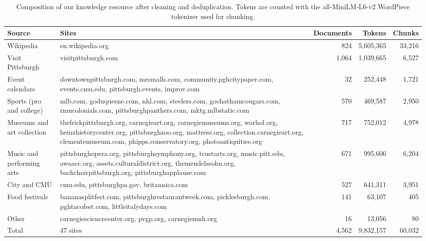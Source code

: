\begin{table}[t]
\centering
\small
\begin{tabular}{lp{}rrr}
\toprule
Source & Sites & Documents & Tokens & Chunks \\
\midrule
Wikipedia & en.wikipedia.org & 824 & 5,605,365 & 33,216 \\
Visit Pittsburgh & visitpittsburgh.com & 1,064 & 1,039,665 & 6,527 \\
Event calendars & downtownpittsburgh.com, mrsmalls.com, community.pghcitypaper.com, events.cmu.edu, pittsburgh.events, improv.com & 32 & 252,448 & 1,721 \\
Sports (pro and college) & mlb.com, goduquesne.com, nhl.com, steelers.com, gochathamcougars.com, rmucolonials.com, pittsburghpanthers.com, mktg.mlbstatic.com & 570 & 469,587 & 2,950 \\
Museums and art collection & thefrickpittsburgh.org, carnegieart.org, carnegiemuseums.org, warhol.org, heinzhistorycenter.org, pittsburghzoo.org, mattress.org, collection.carnegieart.org, clementemuseum.com, phipps.conservatory.org, photoantiquities.org & 717 & 752,012 & 4,978 \\
Music and performing arts & pittsburghopera.org, pittsburghsymphony.org, trustarts.org, music.pitt.edu, awaacc.org, assets.culturaldistrict.org, themendelssohn.org, bachchoirpittsburgh.org, pittsburghapplause.com & 671 & 995,606 & 6,204 \\
City and CMU & cmu.edu, pittsburghpa.gov, britannica.com & 527 & 641,311 & 3,951 \\
Food festivals & bananasplitfest.com, pittsburghrestaurantweek.com, picklesburgh.com, pghtacofest.com, littleitalydays.com & 141 & 63,107 & 405 \\
Other & carnegiesciencecenter.org, pvgp.org, carnegiemnh.org & 16 & 13,056 & 80 \\
\midrule
Total & 47 sites & 4,562 & 9,832,157 & 60,032 \\
\bottomrule
\end{tabular}
\caption{Composition of our knowledge resource after cleaning and deduplication. Tokens are counted with the all-MiniLM-L6-v2 WordPiece tokenizer used for chunking.}
\label{tab:corpus}
\end{table}
